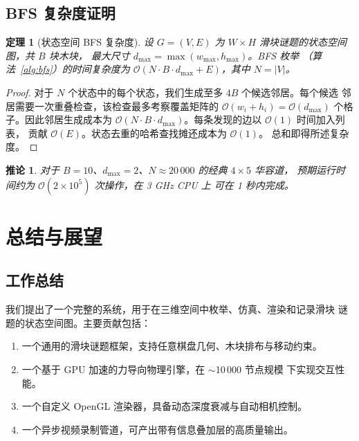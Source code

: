 \documentclass[11pt,a4paper]{report}
\newtheorem{theorem}{定理}[chapter]
\newtheorem{corollary}{推论}[chapter]
\begin{document}
\section{BFS 复杂度证明}
\label{sec:app-bfs}
\begin{theorem}[状态空间 BFS 复杂度]
设 $G = (V,E)$ 为 $W \times H$ 滑块谜题的状态空间图，共 $B$ 块木块，
最大尺寸 $d_{\max} = \max(w_{\max}, h_{\max})$。BFS 枚举
（算法~\ref{alg:bfs}）的时间复杂度为 $\mathcal{O}(N \cdot B \cdot
d_{\max} + E)$，其中 $N = |V|$。
\end{theorem}
\begin{proof}
对于 $N$ 个状态中的每个状态，我们生成至多 $4B$ 个候选邻居。每个候选
邻居需要一次重叠检查，该检查最多考察覆盖矩阵的 $\mathcal{O}(w_i + h_i)
= \mathcal{O}(d_{\max})$ 个格子。因此邻居生成成本为 $\mathcal{O}(N \cdot
B \cdot d_{\max})$。每条发现的边以 $\mathcal{O}(1)$ 时间加入列表，
贡献 $\mathcal{O}(E)$。状态去重的哈希查找摊还成本为 $\mathcal{O}(1)$。
总和即得所述复杂度。
\end{proof}
\begin{corollary}
对于 $B=10$、$d_{\max}=2$、$N \approx 20\,000$ 的经典 $4\times5$ 华容道，
预期运行时间约为 $\mathcal{O}(2 \times 10^5)$ 次操作，在 3 GHz CPU 上
可在 1 秒内完成。
\end{corollary}
\chapter{总结与展望}
\label{ch:conclusion}
\section{工作总结}
\label{sec:summary}
我们提出了一个完整的系统，用于在三维空间中枚举、仿真、渲染和记录滑块
谜题的状态空间图。主要贡献包括：
\begin{enumerate}
    \item 一个通用的滑块谜题框架，支持任意棋盘几何、木块排布与移动约束。
    \item 一个基于 GPU 加速的力导向物理引擎，在 $\sim$10\,000 节点规模
          下实现交互性能。
    \item 一个自定义 OpenGL 渲染器，具备动态深度衰减与自动相机控制。
    \item 一个异步视频录制管道，可产出带有信息叠加层的高质量输出。
\end{enumerate}
\end{document}
